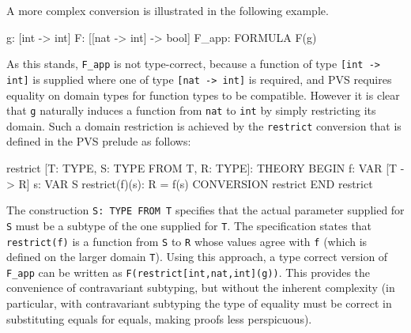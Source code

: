A more complex conversion is illustrated in the following example.
\begin{pvsex}
  g: [int -> int]
  F: [[nat -> int] -> bool]
  F_app: FORMULA F(g)
\end{pvsex}
As this stands, \texttt{F\_app} is not type-correct, because a function of
type \texttt{[int -> int]} is supplied where one of type \texttt{[nat ->
int]} is required, and PVS requires equality on domain types for function
types to be compatible.  However it is clear that \texttt{g} naturally
induces a function from \texttt{nat} to \texttt{int} by simply restricting
its domain.  Such a domain restriction is achieved by the
\texttt{restrict} conversion that is defined in the PVS prelude
as follows:
\begin{session}
  restrict [T: TYPE, S: TYPE FROM T, R: TYPE]: THEORY
   BEGIN
    f: VAR [T -> R]
    s: VAR S
    restrict(f)(s): R = f(s)
    CONVERSION restrict
   END restrict
\end{session}
The construction \texttt{S: TYPE FROM T} specifies that the actual
parameter supplied for \texttt{S} must be a subtype of the one supplied
for \texttt{T}.  The specification states that \texttt{restrict(f)} is a
function from \texttt{S} to \texttt{R} whose values agree with \texttt{f}
(which is defined on the larger domain \texttt{T}).  Using this approach,
a type correct version of \texttt{F\_app} can be written as
\texttt{F(restrict[int,nat,int](g))}.  This provides the convenience of
contravariant subtyping, but without the inherent complexity (in
particular, with contravariant subtyping the type of equality must be
correct in substituting equals for equals, making proofs less
perspicuous).

